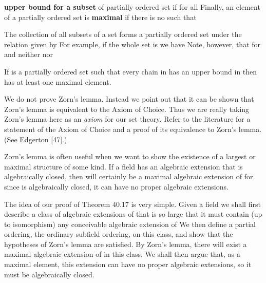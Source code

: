 \documentclass[11pt,oneside]{article}
\begin{document}
\begin{BookBody}

\noindent \textbf{upper bound for a subset}  of partially ordered set  if  for all  Finally, an element  of a partially ordered set  is\textbf{ maximal} if there is no  such that 

 The collection of all subsets of a set forms a partially ordered set under the relation \BookInline{\leq } given by  For example, if the whole set is  we have  Note, however, that for  and  neither  nor \BookEnd{\blacktriangle}


\noindent If  is a partially ordered set such that every chain in  has an upper bound in  then  has at least one maximal element.

\noindent We do not prove Zorn’s lemma. Instead we point out that it can be shown that Zorn’s lemma is equivalent to the Axiom of Choice. Thus we are really taking Zorn’s lemma here as an\textit{ axiom} for our set theory. Refer to the literature for a statement of the Axiom of Choice and a proof of its equivalence to Zorn’s lemma. (See Edgerton [47].)

Zorn’s lemma is often useful when we want to show the existence of a largest or maximal structure of some kind. If a field  has an algebraic extension  that is algebraically closed, then  will certainly be a maximal algebraic extension of  for since  is algebraically closed, it can have no proper algebraic extensions.

The idea of our proof of Theorem 40.17 is very simple. Given a field  we shall first describe a class of algebraic extensions of  that is so large that it must contain (up to isomorphism) any conceivable algebraic extension of  We then define a partial ordering, the ordinary subfield ordering, on this class, and show that the hypotheses of Zorn’s lemma are satisfied. By Zorn’s lemma, there will exist a maximal algebraic extension  of  in this class. We shall then argue that, as a maximal element, this extension  can have no proper algebraic extensions, so it must be algebraically closed.


\end{BookBody}
\end{document}
